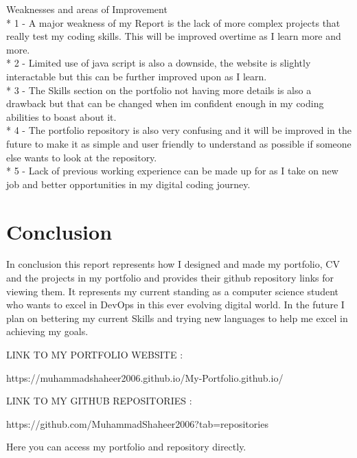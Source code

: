 \documentclass{turabian}
\begin{document}
{\Large Weaknesses and areas of Improvement}\\*
1 - A major weakness of my Report is the lack of more complex projects that really test my coding skills. This will be improved overtime as I learn more and more.\\*
2 - Limited use of java script is also a downside, the website is slightly interactable but this can be further improved upon as I learn.\\*
3 - The Skills section on the portfolio not having more details is also a drawback but that can be changed when im confident enough in my coding abilities to boast about it.\\*
4 - The portfolio repository is also very confusing and it will be improved in the future to make it as simple and user friendly to understand as possible if someone else wants to look at the repository.\\*
5 - Lack of previous working experience can be made up for as I take on new job and better opportunities in my digital coding journey.

\section{\large Conclusion}
In conclusion this report represents how I designed and made my portfolio, CV and the projects in my portfolio and provides their github repository links for viewing them. It represents my current standing as a computer science student who wants to excel in DevOps in this ever evolving digital world. In the future I plan on bettering my current Skills and trying new languages to help me excel in achieving my goals.



{\large LINK TO MY PORTFOLIO WEBSITE :}

https://muhammadshaheer2006.github.io/My-Portfolio.github.io/

{\large LINK TO MY GITHUB REPOSITORIES :}

https://github.com/MuhammadShaheer2006?tab=repositories

Here you can access my portfolio and repository directly.



\pagebreak
\end{document}

